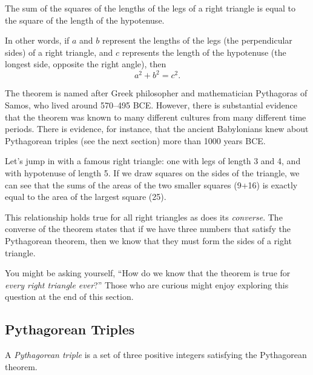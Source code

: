 \begin{boxeddef}
The sum of the squares of the lengths of the \glspl{leg} of a right triangle is equal to the square of the length of the \gls{hypotenuse}.

In other words, if $a$ and $b$ represent the lengths of the legs (the perpendicular sides) of a right triangle, and $c$ represents the length of the hypotenuse (the longest side, opposite the right angle), then \[a^2 + b^2 = c^2.\]
\end{boxeddef}

The theorem is named after Greek philosopher and mathematician Pythagoras of Samos, who lived around 570--495 BCE. However, there is substantial evidence that the theorem was known to many different cultures from many different time periods. There is evidence, for instance, that the ancient Babylonians knew about Pythagorean triples (see the next section) more than 1000 years BCE.

Let's jump in with a famous right triangle: one with legs of length 3 and 4, and with hypotenuse of length 5. If we draw squares on the sides of the triangle, we can see that the sums of the areas of the two smaller squares (9+16) is exactly equal to the area of the largest square (25).
\begin{center}
\end{center}

This relationship holds true for all right triangles as does its \textit{converse}. The converse of the theorem states that if we have three numbers that satisfy the Pythagorean theorem, then we know that they must form the sides of a right triangle.

You might be asking yourself, ``How do we know that the theorem is true for \textit{every right triangle ever}?'' Those who are curious might enjoy exploring this question at the end of this section.

\subsection{Pythagorean Triples}

\begin{boxeddef}
A \textit{Pythagorean triple} is a set of three positive integers satisfying the Pythagorean theorem.
\end{boxeddef}

